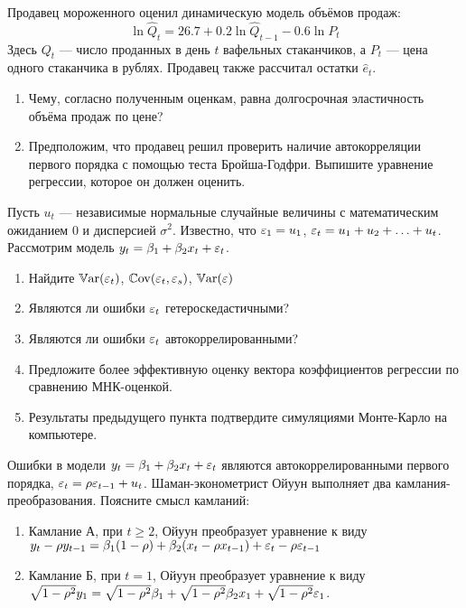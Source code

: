 \begin{problem}
Продавец мороженного оценил динамическую модель объёмов продаж:
\[
\ln \hat{Q}_t=26.7 + 0.2\ln \hat{Q}_{t-1}-0.6\ln P_t
\]
Здесь $Q_t$ --- число проданных в день $t$ вафельных стаканчиков, а $P_t$ --- цена одного стаканчика в рублях. Продавец также рассчитал остатки $\hat{e}_t$.
\begin{enumerate}
\item Чему, согласно полученным оценкам, равна долгосрочная эластичность объёма продаж по цене?
\item Предположим, что продавец решил проверить наличие автокорреляции первого порядка с помощью теста Бройша-Годфри. Выпишите уравнение регрессии, которое он должен оценить.
\end{enumerate}


\begin{sol}
\end{sol}
\end{problem}


\begin{problem}
Пусть $u_t$ --- независимые нормальные случайные величины с
математическим ожиданием $0$ и дисперсией $\sigma^2$. Известно, что $\varepsilon_1=u_1$, $\varepsilon_t=u_1+u_2+\ldots+u_t$. Рассмотрим модель $y_t=\beta_1+\beta_2 x_t + \varepsilon_t$.

\begin{enumerate}
\item Найдите $\mathbb{V}\mathrm{ar}(\varepsilon_t)$, $\mathbb{C}\mathrm{ov}(\varepsilon_t,\varepsilon_s)$, $\mathbb{V}\mathrm{ar}(\varepsilon)$
\item Являются ли ошибки $\varepsilon_t$ гетероскедастичными?
\item Являются ли ошибки $\varepsilon_t$ автокоррелированными?
\item Предложите более эффективную оценку вектора коэффициентов регрессии по сравнению МНК-оценкой.
\item Результаты предыдущего пункта подтвердите симуляциями Монте-Карло на компьютере.
\end{enumerate}


\begin{sol}
\end{sol}
\end{problem}


\begin{problem}
Ошибки в модели $y_t=\beta_1+\beta_2 x_{t}+\varepsilon_t$ являются автокоррелированными первого порядка, $\varepsilon_t=\rho \varepsilon_{t-1}+u_t$. Шаман-эконометрист Ойуун выполняет два камлания-преобразования. Поясните смысл камланий:
\begin{enumerate}
\item Камлание А, при $t\geq 2$, Ойуун преобразует уравнение к виду $y_t-\rho y_{t-1}=\beta_1(1-\rho)+ \beta_2(x_t-\rho x_{t-1})+\varepsilon_t-\rho \varepsilon_{t-1}$
\item Камлание Б, при $t=1$, Ойуун преобразует уравнение к виду $\sqrt{1-\rho^2}y_1=\sqrt{1-\rho^2}\beta_1+\sqrt{1-\rho^2}\beta_2 x_1+\sqrt{1-\rho^2}\varepsilon_1$.
\end{enumerate}


\begin{sol}
\end{sol}
\end{problem}


